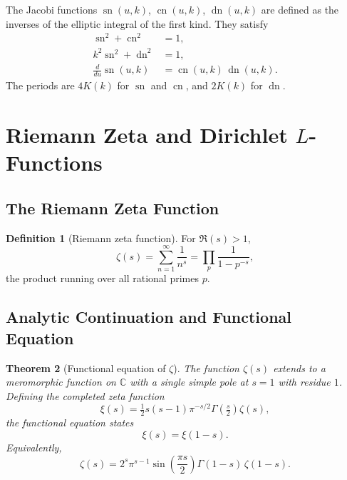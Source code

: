 \documentclass[12pt,a4paper]{amsart}
\newtheorem{theorem}{Theorem}[section]
\theoremstyle{definition}
\newtheorem{definition}[theorem]{Definition}
\begin{document}
The Jacobi functions \(\operatorname{sn}(u,k)\), \(\operatorname{cn}(u,k)\),
\(\operatorname{dn}(u,k)\) are defined as the inverses of the elliptic integral of the
first kind.  They satisfy
\begin{align*}
  \operatorname{sn}^2 + \operatorname{cn}^2 &= 1, \\
  k^2\operatorname{sn}^2 + \operatorname{dn}^2 &= 1, \\
  \frac{d}{du}\operatorname{sn}(u,k) &= \operatorname{cn}(u,k)\,\operatorname{dn}(u,k).
\end{align*}
The periods are \(4K(k)\) for \(\operatorname{sn}\) and \(\operatorname{cn}\), and
\(2K(k)\) for \(\operatorname{dn}\).

\section{Riemann Zeta and Dirichlet \texorpdfstring{$L$}{L}-Functions}
\label{sec:zeta}

\subsection{The Riemann Zeta Function}

\begin{definition}[Riemann zeta function]
For \(\Re(s) > 1\),
\[
  \zeta(s) = \sum_{n=1}^\infty \frac{1}{n^s} = \prod_p \frac{1}{1-p^{-s}},
\]
the product running over all rational primes \(p\).
\end{definition}

\subsection{Analytic Continuation and Functional Equation}

\begin{theorem}[Functional equation of \(\zeta\)]\label{thm:zeta_functional}
The function \(\zeta(s)\) extends to a meromorphic function on \(\mathbb{C}\) with a
single simple pole at \(s = 1\) with residue \(1\).  Defining the completed zeta function
\[
  \xi(s) = \tfrac{1}{2}s(s-1)\pi^{-s/2}\Gamma\!\left(\tfrac{s}{2}\right)\zeta(s),
\]
the functional equation states
\[
  \xi(s) = \xi(1-s).
\]
Equivalently,
\[
  \zeta(s) = 2^s\pi^{s-1}\sin\!\left(\frac{\pi s}{2}\right)\Gamma(1-s)\,\zeta(1-s).
\]
\end{theorem}
\end{document}
